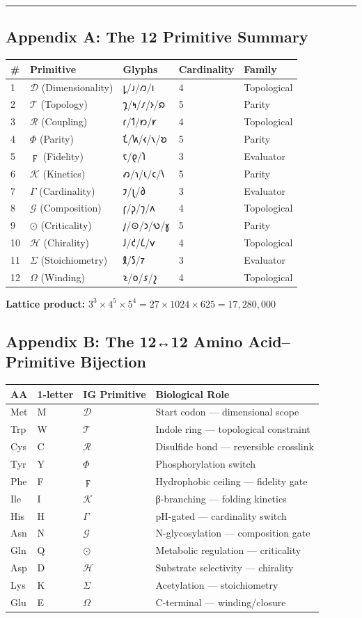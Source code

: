 \documentclass[12pt,a4paper]{article}
\begin{document}
\begin{center}\rule{0.5\linewidth}{0.5pt}\end{center}

\hypertarget{appendix-a-the-12-primitive-summary}{%
\subsection{Appendix A: The 12 Primitive
Summary}\label{appendix-a-the-12-primitive-summary}}

\begin{longtable}[]{@{}lllll@{}}
\toprule
\# & Primitive & Glyphs & Cardinality & Family\tabularnewline
\midrule
\endhead
1 & \(\mathcal{D}\) (Dimensionality) & 𐑛/𐑨/𐑼/𐑦 & 4 &
Topological\tabularnewline
2 & \(\mathcal{T}\) (Topology) & 𐑡/𐑰/𐑥/𐑶/𐑸 & 5 & Parity\tabularnewline
3 & \(\mathcal{R}\) (Coupling) & 𐑩/𐑑/𐑽/𐑾 & 4 &
Topological\tabularnewline
4 & \(\Phi\) (Parity) & 𐑗/𐑿/𐑬/𐑯/𐑹 & 5 & Parity\tabularnewline
5 & \(\digamma\) (Fidelity) & 𐑱/𐑞/𐑐 & 3 & Evaluator\tabularnewline
6 & \(\mathcal{K}\) (Kinetics) & 𐑺/𐑪/𐑧/𐑤/𐑘 & 5 & Parity\tabularnewline
7 & \(\Gamma\) (Cardinality) & 𐑲/𐑚/𐑔 & 3 & Evaluator\tabularnewline
8 & \(\mathcal{G}\) (Composition) & 𐑝/𐑜/𐑠/𐑵 & 4 &
Topological\tabularnewline
9 & \(\odot\) (Criticality) & 𐑢/⊙/𐑮/𐑻/𐑣 & 5 & Parity\tabularnewline
10 & \(\mathcal{H}\) (Chirality) & 𐑓/𐑒/𐑖/𐑫 & 4 &
Topological\tabularnewline
11 & \(\Sigma\) (Stoichiometry) & 𐑙/𐑕/𐑳 & 3 & Evaluator\tabularnewline
12 & \(\Omega\) (Winding) & 𐑷/𐑴/𐑭/𐑟 & 4 & Topological\tabularnewline
\bottomrule
\end{longtable}

\textbf{Lattice product:}
\(3^3 \times 4^5 \times 5^4 = 27 \times 1024 \times 625 = 17,280,000\)

\hypertarget{appendix-b-the-1212-amino-acidprimitive-bijection}{%
\subsection{Appendix B: The 12↔12 Amino Acid--Primitive
Bijection}\label{appendix-b-the-1212-amino-acidprimitive-bijection}}

\begin{longtable}[]{@{}llll@{}}
\toprule
AA & 1-letter & IG Primitive & Biological Role\tabularnewline
\midrule
\endhead
Met & M & \(\mathcal{D}\) & Start codon --- dimensional
scope\tabularnewline
Trp & W & \(\mathcal{T}\) & Indole ring --- topological
constraint\tabularnewline
Cys & C & \(\mathcal{R}\) & Disulfide bond --- reversible
crosslink\tabularnewline
Tyr & Y & \(\Phi\) & Phosphorylation switch\tabularnewline
Phe & F & \(\digamma\) & Hydrophobic ceiling --- fidelity
gate\tabularnewline
Ile & I & \(\mathcal{K}\) & β-branching --- folding
kinetics\tabularnewline
His & H & \(\Gamma\) & pH-gated --- cardinality switch\tabularnewline
Asn & N & \(\mathcal{G}\) & N-glycosylation --- composition
gate\tabularnewline
Gln & Q & \(\odot\) & Metabolic regulation ---
criticality\tabularnewline
Asp & D & \(\mathcal{H}\) & Substrate selectivity ---
chirality\tabularnewline
Lys & K & \(\Sigma\) & Acetylation --- stoichiometry\tabularnewline
Glu & E & \(\Omega\) & C-terminal --- winding/closure\tabularnewline
\bottomrule
\end{longtable}
\end{document}
